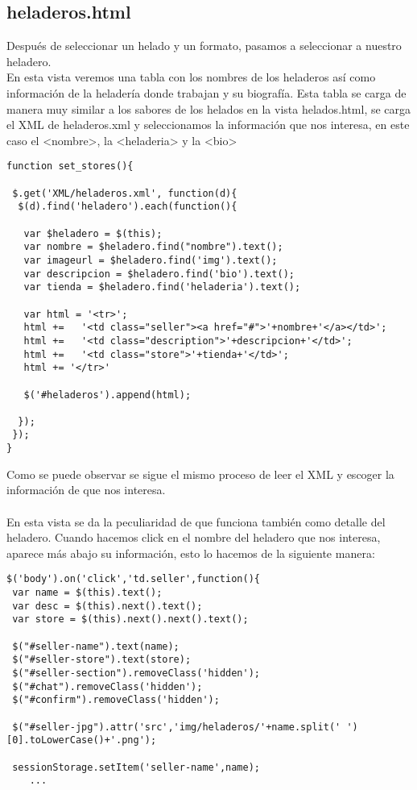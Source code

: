 \documentclass[11pt,a4paper]{article}
\begin{document}
\subsection{heladeros.html}
Después de seleccionar un helado y un formato, pasamos a seleccionar a nuestro heladero.\\
En esta vista veremos una tabla con los nombres de los heladeros así como información de la heladería donde trabajan y su biografía. Esta tabla se carga de manera muy similar a los sabores de los helados en la vista helados.html, se carga el XML de heladeros.xml y seleccionamos la información que nos interesa, en este caso el <nombre>, la <heladeria> y la <bio>\\
\lstset{language=Java}
\begin{lstlisting}
function set_stores(){

 $.get('XML/heladeros.xml', function(d){
  $(d).find('heladero').each(function(){

   var $heladero = $(this);
   var nombre = $heladero.find("nombre").text();
   var imageurl = $heladero.find('img').text();
   var descripcion = $heladero.find('bio').text();
   var tienda = $heladero.find('heladeria').text();

   var html = '<tr>';
   html +=   '<td class="seller"><a href="#">'+nombre+'</a></td>';
   html +=   '<td class="description">'+descripcion+'</td>';
   html +=   '<td class="store">'+tienda+'</td>';
   html += '</tr>'

   $('#heladeros').append(html);

  });
 });
}
\end{lstlisting}

Como se puede observar se sigue el mismo proceso de leer el XML y escoger la información de que nos interesa.\\
\\
En esta vista se da la peculiaridad de que funciona también como detalle del heladero. Cuando hacemos click en el nombre del heladero que nos interesa, aparece más abajo su información, esto lo hacemos de la siguiente manera:\\
\begin{lstlisting}
$('body').on('click','td.seller',function(){
 var name = $(this).text();
 var desc = $(this).next().text();
 var store = $(this).next().next().text();

 $("#seller-name").text(name);
 $("#seller-store").text(store);
 $("#seller-section").removeClass('hidden');
 $("#chat").removeClass('hidden');
 $("#confirm").removeClass('hidden');

 $("#seller-jpg").attr('src','img/heladeros/'+name.split(' ')[0].toLowerCase()+'.png');

 sessionStorage.setItem('seller-name',name);
	...
\end{lstlisting}
\end{document}
